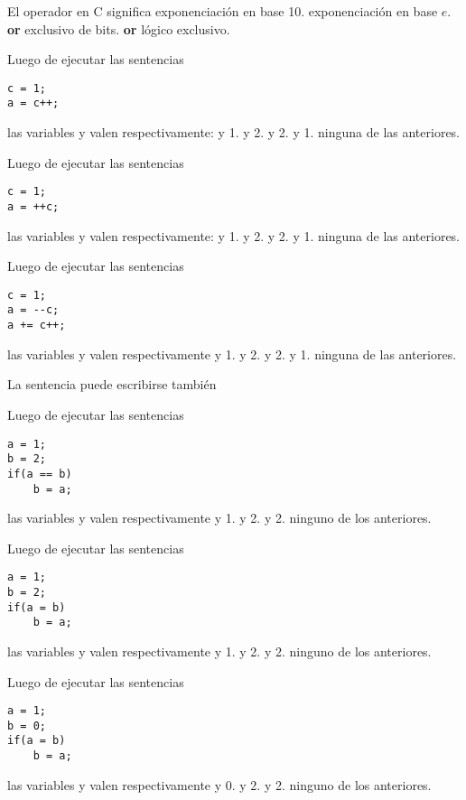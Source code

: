\begin{preguntas}
\label{tc-operadores-preg}
\question El operador \code{^} en C significa
\choice exponenciación en base 10.
\choice exponenciación en base $e$.
\correctchoice \textbf{or} exclusivo de bits.
\choice \textbf{or} lógico exclusivo.

\question Luego de ejecutar las sentencias 
\begin{lstlisting}
c = 1; 
a = c++;	
\end{lstlisting}
las variables  y  valen respectivamente:
 y 1.
 y 2.
 y 2.
 y 1.
\choice ninguna de las anteriores.

\question Luego de ejecutar las sentencias 
\begin{lstlisting}
c = 1; 
a = ++c;
\end{lstlisting}
las variables  y  valen respectivamente:
 y 1.
 y 2.
 y 2.
 y 1.
\choice ninguna de las anteriores.

\question Luego de ejecutar las sentencias 
\begin{lstlisting}
c = 1; 
a = --c; 
a += c++;
\end{lstlisting}
las variables  y  valen respectivamente
 y 1.
 y 2.
 y 2.
 y 1.
\correctchoice ninguna de las anteriores.

\question La sentencia  puede escribirse también
\choice {}
\correctchoice {}
\choice {}
\choice {}

\question Luego de ejecutar las sentencias 
\begin{lstlisting}
a = 1; 
b = 2; 
if(a == b) 
	b = a;	
\end{lstlisting}
las variables  y  valen respectivamente 
 y 1.
 y 2.
 y 2.
\choice ninguno de los anteriores.

\question Luego de ejecutar las sentencias 
\begin{lstlisting}
a = 1; 
b = 2; 
if(a = b) 
	b = a;	
\end{lstlisting}
las variables  y  valen respectivamente 
 y 1.
 y 2.
 y 2.
\choice ninguno de los anteriores.

\question Luego de ejecutar las sentencias 
\begin{lstlisting}
a = 1; 
b = 0; 
if(a = b) 
	b = a;
\end{lstlisting}
las variables  y  valen respectivamente 
 y 0.
 y 2.
 y 2.
\choice ninguno de los anteriores.


\end{preguntas}
